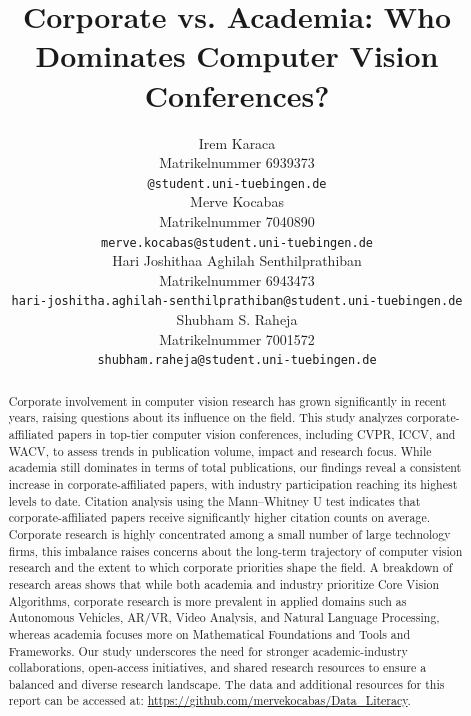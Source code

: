 \documentclass{article}
\title{Corporate vs. Academia: Who Dominates Computer Vision Conferences?}
\author{%
  \small Irem Karaca\\
  \small Matrikelnummer 6939373\\
  \small \texttt{@student.uni-tuebingen.de} \\
  \And
  \small Merve Kocabas\\
  \small Matrikelnummer 7040890\\
  \small \texttt{merve.kocabas@student.uni-tuebingen.de} \\
  \AND
  \small Hari Joshithaa Aghilah Senthilprathiban\\
  \small Matrikelnummer 6943473\\
  \small \texttt{hari-joshitha.aghilah-senthilprathiban@student.uni-tuebingen.de} \\
  \AND
  \small Shubham S. Raheja\\
  \small Matrikelnummer 7001572\\
  \small \texttt{shubham.raheja@student.uni-tuebingen.de} \\  
}
\begin{document}
\maketitle

\begin{abstract}

Corporate involvement in computer vision research has grown significantly in recent years, raising questions about its influence on the field. This study analyzes corporate-affiliated papers in top-tier computer vision conferences, including CVPR, ICCV, and WACV, to assess trends in publication volume,  impact and research focus. While academia still dominates in terms of total publications, our findings reveal a consistent increase in corporate-affiliated papers, with industry participation reaching its highest levels to date. Citation analysis using the Mann–Whitney U test indicates that corporate-affiliated papers receive significantly higher citation counts on average. Corporate research is highly concentrated among a small number of large technology firms, this imbalance raises concerns about the long-term trajectory of computer vision research and the extent to which corporate priorities shape the field. A breakdown of research areas shows that while both academia and industry prioritize Core Vision Algorithms, corporate research is more prevalent in applied domains such as Autonomous Vehicles, AR/VR, Video Analysis, and Natural Language Processing, whereas academia focuses more on Mathematical Foundations and Tools and Frameworks. Our study underscores the need for stronger academic-industry collaborations, open-access initiatives, and shared research resources to ensure a balanced and diverse research landscape. The data and additional resources for this report can be accessed at: \url{https://github.com/mervekocabas/Data_Literacy}.

\end{abstract}

\end{document}
